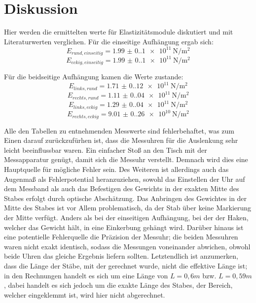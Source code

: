 \section{Diskussion}
\label{sec:Diskussion}
Hier werden die ermittelten werte für Elastizitätsmodule diskutiert und mit Literaturwerten verglichen.
Für die einseitige Aufhängung ergab sich:
\begin{equation*}
    E_{rund,einseitig} = \qty{1.99(0.1)e11}{\newton\per\meter\squared}
  \end{equation*}
\begin{equation*}
    E_{eckig,einseitig} = \qty{1.99(0.1)e11}{\newton\per\meter\squared}
\end{equation*}

Für die beidseitige Aufhängung kamen die Werte zustande:
\begin{equation*}
    E_{links,rund} = \qty{1.71(0.12)e11}{\newton\per\meter\squared}
  \end{equation*}
\begin{equation*}
    E_{rechts,rund} = \qty{1.11(0.04)e11}{\newton\per\meter\squared}
\end{equation*}
\begin{equation*}
    E_{links,eckig} = \qty{1.29(0.04)e11}{\newton\per\meter\squared}
\end{equation*}
\begin{equation*}
    E_{rechts,eckig} = \qty{9.01(0.26)e10}{\newton\per\meter\squared}
\end{equation*}

\noindent Alle den Tabellen zu entnehmenden Messwerte sind fehlerbehaftet, was zum Einen
darauf zurückzufürhen ist, dass die Messuhren für die Auslenkung sehr leicht
beeinflussbar waren. Ein einfacher Stoß an den Tisch mit der Messapparatur 
genügt, damit sich die Messuhr verstellt. Demnach wird dies eine Hauptquelle
für mögliche Fehler sein. Des Weiteren ist allerdings auch das Augenmaß als 
Fehlerpotential heranzuziehen, sowohl das Einstellen der Uhr auf dem Messband
als auch das Befestigen des Gewichts in der exakten Mitte des Stabes erfolgt
durch optische Abschätzung. Das Anbringen des Gewichtes in der Mitte des 
Stabes ist vor Allem problematisch, da der Stab über keine Markierung der Mitte
verfügt. Anders als bei der einseitigen Aufhängung, bei der der Haken, welcher 
das Gewicht hält, in eine Einkerbung gehängt wird. Darüber hinaus ist eine 
potentielle Fehlerquelle die Präzision der Messuhr; die beiden Messuhren waren
nicht exakt identisch, sodass die Messungen voneinander abwichen, obwohl beide 
Uhren das gleiche Ergebnis liefern sollten. Letztendlich ist anzumerken, dass 
die Länge der Stäbe, mit der gerechnet wurde, nicht die effektive Länge ist;
in den Rechnungen handelt es sich um eine Länge von $L = 0,6m$ bzw. $L = 0,59m$,
dabei handelt es sich jedoch um die exakte Länge des Stabes, der Bereich, welcher
eingeklemmt ist, wird hier nicht abgerechnet.